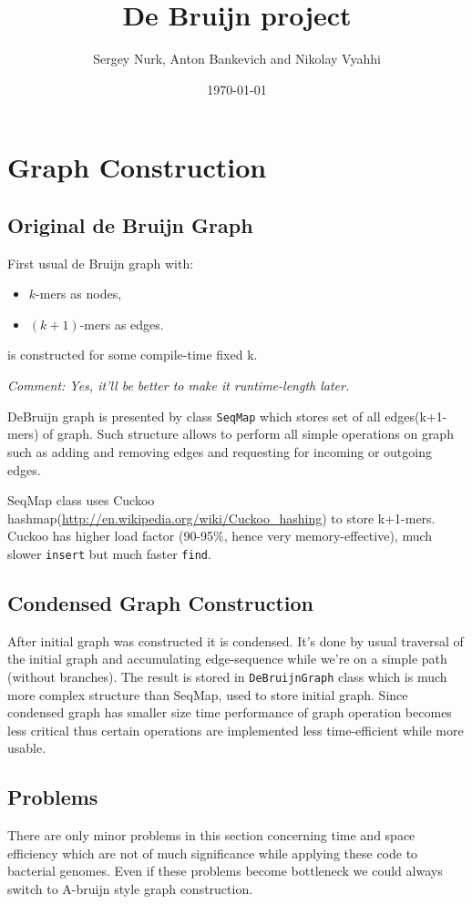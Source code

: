 \documentclass[14pt]{article}
\title{De Bruijn project}
\author{Sergey Nurk, Anton Bankevich and Nikolay Vyahhi}
\date{\today}
\begin{document}
\maketitle

\section{Graph Construction}

\subsection{Original de Bruijn Graph}

First usual de Bruijn graph with:
\begin{itemize}
\item $k$-mers as nodes,
\item $(k+1)$-mers as edges.
\end{itemize}
is constructed for some compile-time fixed k. 

\textit{Comment: Yes, it'll be better to make it runtime-length later.}

DeBruijn graph is presented by class \texttt{SeqMap} which stores set of all edges(k+1-mers) of graph. Such structure allows to perform all simple operations on graph such as adding and removing edges and requesting for incoming or outgoing edges.

SeqMap class uses Cuckoo hashmap(\url{http://en.wikipedia.org/wiki/Cuckoo_hashing}) to store k+1-mers. Cuckoo has higher load factor (90-95\%, hence very memory-effective), much slower \texttt{insert} but much faster \texttt{find}.

\subsection{Condensed Graph Construction}

After initial graph was constructed it is condensed. It's done by usual traversal of the initial graph and accumulating edge-sequence while we're on a simple path (without branches). The result is stored in \texttt{DeBruijnGraph} class which is much more complex structure than SeqMap, used to store initial graph. Since condensed graph has smaller size time performance of graph operation becomes less critical thus certain operations are implemented less time-efficient while more usable.

\subsection{Problems}
There are only minor problems in this section concerning time and space efficiency which are not of much significance while applying these code to bacterial genomes. Even if these problems become bottleneck we could always switch to A-bruijn style graph construction.
\end{document}

